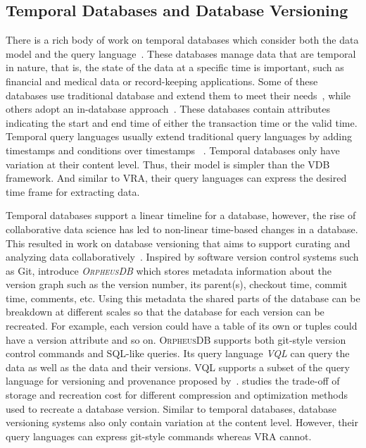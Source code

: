 \subsection{Temporal Databases and Database Versioning}
\label{sec:db-ver}

There is a rich body of work on temporal databases which consider both the data model and the query language~\cite{tempDataMng, tempDBSurv, tempDBbook}.
These databases manage data that are temporal in nature, that is, the state of the data at a specific
time is important, such as financial and medical data or record-keeping applications. 
%
Some of these databases use traditional database and extend them to meet their 
needs~\cite{stratum,Teradata, db2}, while others adopt an in-database 
approach~\cite{KaufmannMVFKFM13sigmod}.
%
These databases contain attributes indicating the start and end time of either 
the transaction time or the valid time. Temporal query languages usually extend 
traditional query languages by adding timestamps and conditions over 
timestamps ~\cite{chomicki95,Jensen2009,evalTempLang}.
%
Temporal databases only have variation at their content level. Thus, their model is simpler 
than the VDB framework. And similar to VRA, their query languages can express
the desired time frame for extracting data. 


Temporal databases support a linear timeline for a database, however, the rise of collaborative data 
science has led to non-linear time-based changes in a database. 
This resulted in work on database versioning that aims to support curating and analyzing data 
collaboratively~\cite{datahub15cidr}. Inspired by software version control systems such as Git, 
\citet{dbVersioning} introduce \emph{\textsc{OrpheusDB}} which stores metadata information
about the version graph such as 
the version number, its parent(s), checkout time, commit time, comments, etc. 
Using this metadata the shared parts of the database can be breakdown at different scales so
that the database for each version can be recreated.
For example, each version could have a table of its own or 
tuples could have a version attribute and so on. 
\textsc{OrpheusDB} supports both git-style version control 
commands and SQL-like queries. Its query language \emph{VQL} can query the data 
as well as the data and their versions. VQL supports a subset of the query language for 
versioning and provenance proposed by~\citet{vqlAndProv}. 
\citet{datasetVersioning} studies the trade-off of storage and recreation cost for 
different compression and optimization methods used to recreate a database version.
%
Similar to temporal databases, database versioning systems also only contain variation
at the content level. However, their query languages can express git-style commands
whereas VRA cannot. 


